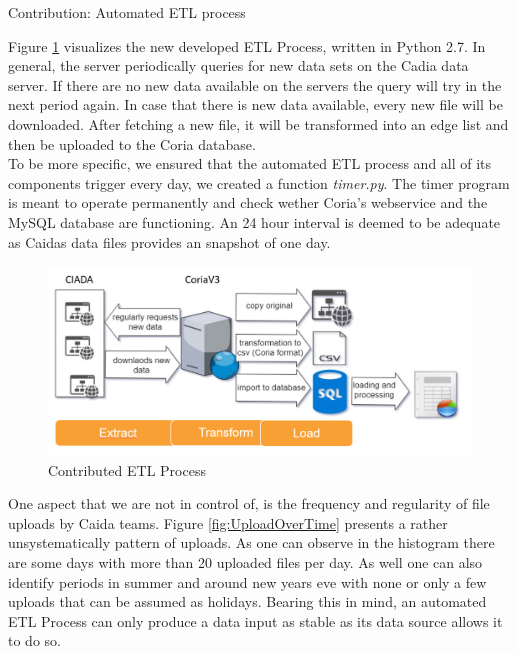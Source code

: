 \documentclass[conference, 11pt]{IEEEtran}
\begin{document}
\begin{subsection}{Contribution: Automated ETL process} \label{ssec:contribution}

Figure \ref{fig:etl2} visualizes the new developed ETL Process, written in Python 2.7. In general, the server periodically queries for new data sets on the Cadia data server. If there are no new data available on the servers the query will try in the next period again. 
In case that there is new data available, every new file will be downloaded. After fetching a new file, it will be transformed into an edge list and then be uploaded to the Coria database. \\ 

To be more specific, we ensured that the automated ETL process and all of its components trigger every day, we created a function \textit{timer.py}. The timer program is meant to operate permanently and check wether Coria's webservice and the MySQL database are functioning. An 24 hour interval is deemed to be adequate as Caida\textquotesingle s data files provides an snapshot of one day. \\ 

\vspace{0.5cm}
\begin{figure}[H]
\centerline{\includegraphics[width=\columnwidth]{Graphics/ETL2.png}}
\caption{Contributed ETL Process}
\label{fig:etl2}
\end{figure}\vspace{0.5cm}


One aspect that we are not in control of, is the frequency and regularity of file uploads by Caida teams. Figure \ref{fig:UploadOverTime} presents a rather unsystematically pattern of uploads. As one can observe in the histogram there are some days with more than 20 uploaded files per day. As well one can also identify periods in summer and around new years eve with none or only a few uploads that can be assumed as holidays. Bearing this in mind, an automated ETL Process can only produce a data input as stable as its data source allows it to do so.


\end{subsection}
\end{document}
